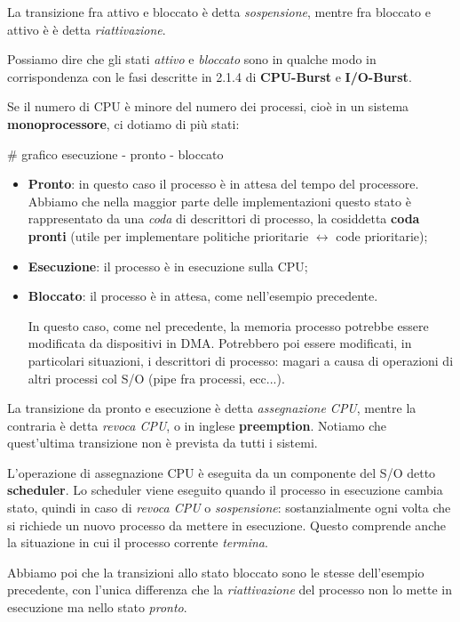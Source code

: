 \documentclass[a4paper,11pt]{article}
\begin{document}
La transizione fra attivo e bloccato è detta \textit{sospensione}, mentre fra bloccato e attivo è è detta \textit{riattivazione}.

Possiamo dire che gli stati \textit{attivo} e \textit{bloccato} sono in qualche modo in corrispondenza con le fasi descritte in 2.1.4 di \textbf{CPU-Burst} e \textbf{I/O-Burst}.

\par\bigskip

Se il numero di CPU è minore del numero dei processi, cioè in un sistema \textbf{monoprocessore}, ci dotiamo di più stati:

# grafico esecuzione - pronto - bloccato

\begin{itemize}
	\item \textbf{Pronto}: in questo caso il processo è in attesa del tempo del processore. Abbiamo che nella maggior parte delle implementazioni questo stato è rappresentato da una \textit{coda} di descrittori di processo, la cosiddetta \textbf{coda pronti} (utile per implementare politiche prioritarie $\leftrightarrow$ code prioritarie);
	\item \textbf{Esecuzione}: il processo è in esecuzione sulla CPU;
	\item \textbf{Bloccato}: il processo è in attesa, come nell'esempio precedente. 

		In questo caso, come nel precedente, la memoria processo potrebbe essere modificata da dispositivi in DMA.
	Potrebbero poi essere modificati, in particolari situazioni, i descrittori di processo: magari a causa di operazioni di altri processi col S/O (pipe fra processi, ecc...).	
\end{itemize}

La transizione da pronto e esecuzione è detta \textit{assegnazione CPU}, mentre la contraria è detta \textit{revoca CPU}, o in inglese \textbf{preemption}.
Notiamo che quest'ultima transizione non è prevista da tutti i sistemi.

L'operazione di assegnazione CPU è eseguita da un componente del S/O detto \textbf{scheduler}. Lo scheduler viene eseguito quando il processo in esecuzione cambia stato, quindi in caso di \textit{revoca CPU} o \textit{sospensione}: sostanzialmente ogni volta che si richiede un nuovo processo da mettere in esecuzione.
Questo comprende anche la situazione in cui il processo corrente \textit{termina}.

Abbiamo poi che la transizioni allo stato bloccato sono le stesse dell'esempio precedente, con l'unica differenza che la \textit{riattivazione} del processo non lo mette in esecuzione ma nello stato \textit{pronto}.
\end{document}
